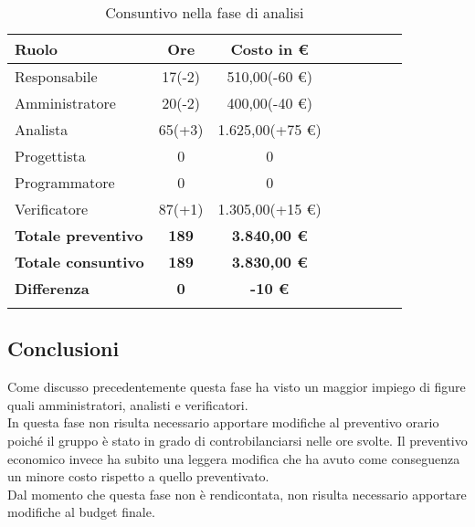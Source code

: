 \documentclass[../piano_di_progetto.tex]{subfiles}
\begin{document}
\begin{center}
	\begin{longtable}{|l|c|c|c|c|c|c|c|}
		\hline
		\rowcolor{lightgray}
		\textbf{Ruolo} & \textbf{Ore} & \textbf{Costo in €}\\
		\hline
		Responsabile & 17(-2) & 510,00(-60 €) \\
		\hline
		Amministratore & 20(-2) & 400,00(-40 €) \\
		\hline
		Analista & 65(+3) & 1.625,00(+75 €) \\
		\hline
		Progettista & 0 & 0 \\
		\hline
		Programmatore & 0 & 0 \\
		\hline
		Verificatore & 87(+1) & 1.305,00(+15 €) \\
		\hline
		\textbf{Totale preventivo} & \textbf{189} & \textbf{3.840,00 €} \\
		\hline
		\textbf{Totale consuntivo} & \textbf{189} & \textbf{3.830,00 €} \\
		\hline
		\textbf{Differenza} & \textbf{0} & \textbf{-10 €}\\
		\hline
		\rowcolor{white}
		\caption{Consuntivo nella fase di analisi}
	\end{longtable}
\end{center}

\subsection{ Conclusioni}%
\label{sub:cons_fine}
Come discusso precedentemente questa fase ha visto un maggior impiego di figure quali amministratori, analisti e verificatori.\\
In questa fase non risulta necessario apportare modifiche al preventivo orario poiché il gruppo è stato in grado di controbilanciarsi nelle ore svolte. Il preventivo economico invece ha subito una leggera modifica che ha avuto come conseguenza un minore costo rispetto a quello preventivato. \\
Dal momento che questa fase non è rendicontata, non risulta necessario apportare modifiche al budget finale. 
\end{document}
